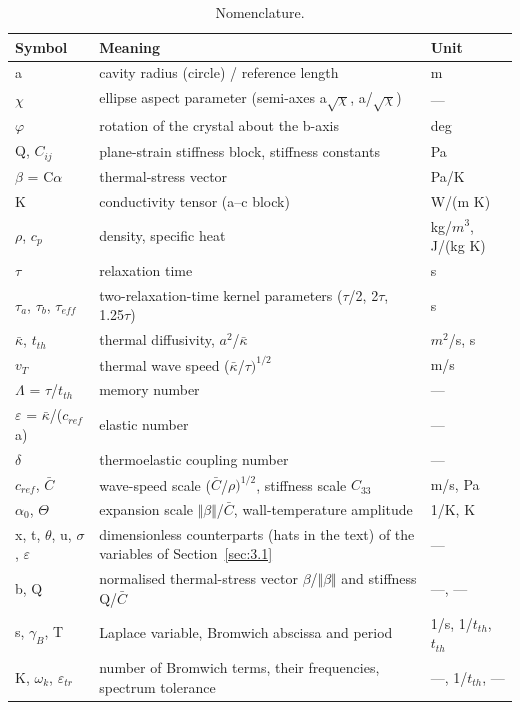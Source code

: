 \documentclass[preprint,12pt]{elsarticle}
\begin{document}
\begin{table}[htbp]
\centering
\caption{Nomenclature.}
\label{tab:11}
\begin{tabularx}{\textwidth}{lXl}
\toprule
Symbol & Meaning & Unit \\
\midrule
a & cavity radius (circle) / reference length & m \\
$\chi$ & ellipse aspect parameter (semi-axes a$\sqrt \chi$, a/$\sqrt \chi$) & --- \\
$\varphi$ & rotation of the crystal about the b-axis & deg \\
Q, $C_{ij}$ & plane-strain stiffness block, stiffness constants & Pa \\
$\beta$ = C$\alpha$ & thermal-stress vector & Pa/K \\
K & conductivity tensor (a--c block) & W/(m K) \\
$\rho$, $c_{p}$ & density, specific heat & kg/$m^{3}$, J/(kg K) \\
$\tau$ & relaxation time & s \\
$\tau_{a}$, $\tau_{b}$, $\tau_{eff}$ & two-relaxation-time kernel parameters ($\tau$/2, 2$\tau$, 1.25$\tau$) & s \\
$\bar{\kappa}$, $t_{th}$ & thermal diffusivity, $a^{2}$/$\bar{\kappa}$ & $m^{2}$/s, s \\
$v_{T}$ & thermal wave speed ($\bar{\kappa}$/$\tau)^{1/2}$ & m/s \\
$\Lambda$ = $\tau$/$t_{th}$ & memory number & --- \\
$\varepsilon$ = $\bar{\kappa}$/($c_{ref}$a) & elastic number & --- \\
$\delta$ & thermoelastic coupling number & --- \\
$c_{ref}$, $\bar{C}$ & wave-speed scale ($\bar{C}$/$\rho)^{1/2}$, stiffness scale $C_{33}$ & m/s, Pa \\
$\alpha_{0}$, $\Theta$ & expansion scale $\Vert \beta \Vert$/$\bar{C}$, wall-temperature amplitude & 1/K, K \\
x, t, $\theta$, u, $\sigma$, $\varepsilon$ & dimensionless counterparts (hats in the text) of the variables of Section~\ref{sec:3.1} & --- \\
b, Q & normalised thermal-stress vector $\beta$/$\Vert \beta \Vert$ and stiffness Q/$\bar{C}$ & ---, --- \\
s, $\gamma_{B}$, T & Laplace variable, Bromwich abscissa and period & 1/s, 1/$t_{th}$, $t_{th}$ \\
K, $\omega_{k}$, $\varepsilon_{tr}$ & number of Bromwich terms, their frequencies, spectrum tolerance & ---, 1/$t_{th}$, --- \\

\end{tabularx}
\end{table}
\end{document}
